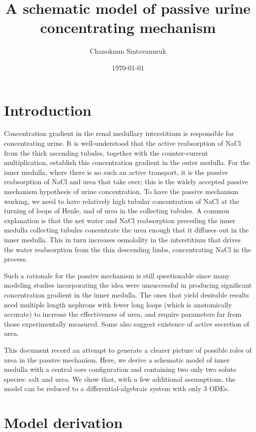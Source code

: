 \documentclass{article}
\title{A schematic model of passive urine concentrating mechanism}
\author[1]{Chanoknun Sintavanuruk}
\date{\today}
\begin{document}
\sloppy %
\maketitle

\section{Introduction}

Concentration gradient in the renal medullary interstitium is responsible for concentrating urine.
It is well-understood that the active reabsorption of NaCl from the thick ascending tubules, together with the counter-current multiplication, establish this concentration gradient in the outer medulla.
For the inner medulla, where there is no such an active transport, it is the passive reabsorption of NaCl and urea that take over; this is the widely accepted passive mechanism hypothesis of urine concentration.
To have the passive mechanism working, we need to have relatively high tubular concentration of NaCl at the turning of loops of Henle, and of urea in the collecting tubules.
A common explanation is that the net water and NaCl reabsorption preceding the inner medulla collecting tubules concentrate the urea enough that it diffuses out in the inner medulla.
This in turn increases osmolality in the interstitium that drives the water reabsorption from the thin descending limbs, concentrating NaCl in the process.

Such a rationale for the passive mechanism is still questionable since many modeling studies incorporating the idea were unsuccessful in producing significant concentration gradient in the inner medulla.
The ones that yield desirable results need multiple length nephrons with fewer long loops (which is anatomically accurate) to increase the effectiveness of urea, and require parameters far from those experimentally measured.
Some also suggest existence of active secretion of urea.

This document record an attempt to generate a clearer picture of possible roles of urea in the passive mechanism.
Here, we derive a schematic model of inner medulla with a central core configuration and containing two only two solute species: salt and urea.
We show that, with a few additional assumptions, the model can be reduced to a differential-algebraic system with only 3 ODEs.

\section{Model derivation}
\end{document}
